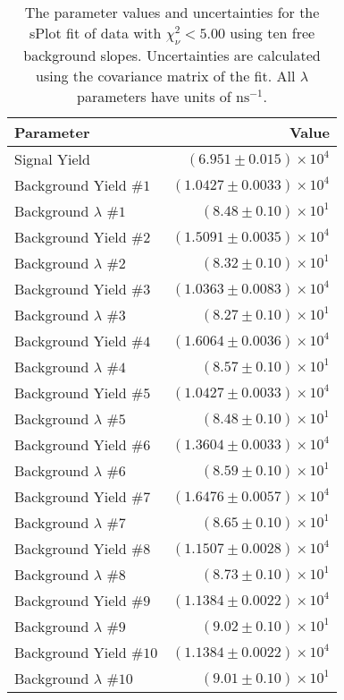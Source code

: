 
\begin{table}[ht]
    \begin{center}
        \begin{tabular}{lr}\toprule
            Parameter & Value \\\midrule
            Signal Yield & $(6.951 \pm 0.015) \times 10^{4}$ \\
            Background Yield $\#1$ & $(1.0427 \pm 0.0033) \times 10^{4}$ \\
            Background $\lambda$ $\#1$ & $(8.48 \pm 0.10) \times 10^{1}$ \\
            Background Yield $\#2$ & $(1.5091 \pm 0.0035) \times 10^{4}$ \\
            Background $\lambda$ $\#2$ & $(8.32 \pm 0.10) \times 10^{1}$ \\
            Background Yield $\#3$ & $(1.0363 \pm 0.0083) \times 10^{4}$ \\
            Background $\lambda$ $\#3$ & $(8.27 \pm 0.10) \times 10^{1}$ \\
            Background Yield $\#4$ & $(1.6064 \pm 0.0036) \times 10^{4}$ \\
            Background $\lambda$ $\#4$ & $(8.57 \pm 0.10) \times 10^{1}$ \\
            Background Yield $\#5$ & $(1.0427 \pm 0.0033) \times 10^{4}$ \\
            Background $\lambda$ $\#5$ & $(8.48 \pm 0.10) \times 10^{1}$ \\
            Background Yield $\#6$ & $(1.3604 \pm 0.0033) \times 10^{4}$ \\
            Background $\lambda$ $\#6$ & $(8.59 \pm 0.10) \times 10^{1}$ \\
            Background Yield $\#7$ & $(1.6476 \pm 0.0057) \times 10^{4}$ \\
            Background $\lambda$ $\#7$ & $(8.65 \pm 0.10) \times 10^{1}$ \\
            Background Yield $\#8$ & $(1.1507 \pm 0.0028) \times 10^{4}$ \\
            Background $\lambda$ $\#8$ & $(8.73 \pm 0.10) \times 10^{1}$ \\
            Background Yield $\#9$ & $(1.1384 \pm 0.0022) \times 10^{4}$ \\
            Background $\lambda$ $\#9$ & $(9.02 \pm 0.10) \times 10^{1}$ \\
            Background Yield $\#10$ & $(1.1384 \pm 0.0022) \times 10^{4}$ \\
            Background $\lambda$ $\#10$ & $(9.01 \pm 0.10) \times 10^{1}$ \\\bottomrule
        \end{tabular}
        \caption{The parameter values and uncertainties for the sPlot fit of data with $\chi^2_\nu < 5.00$ using ten free background slopes. Uncertainties are calculated using the covariance matrix of the fit. All $\lambda$ parameters have units of $\si{\nano\second}^{-1}$.}\label{tab:splot-fit-results-chisqdof-5.00-free-10}
    \end{center}
\end{table}

